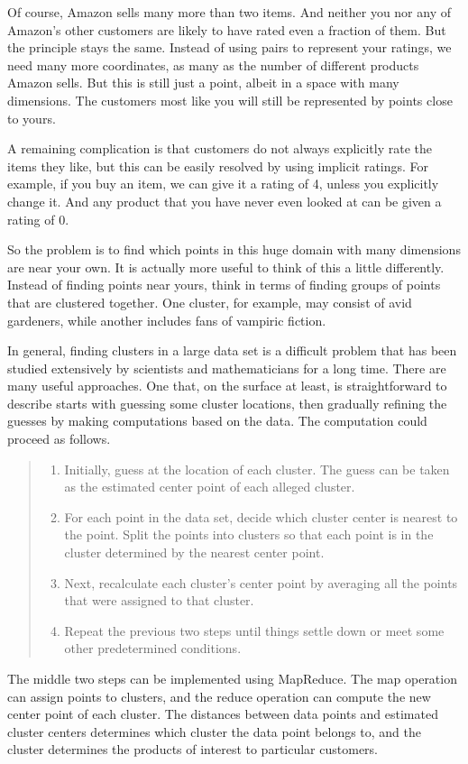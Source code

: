 Of course, Amazon sells many more than two items.  And neither you nor any
of Amazon's other customers are likely to have rated even a fraction of them.
But the principle stays the same.  Instead of using pairs to represent your
ratings, we need many more coordinates, as many as the number of
different products Amazon sells.
But this is still just a point, albeit in a space with many dimensions.
The customers most like you will still be represented by points close to yours.

A remaining complication is that customers do not always explicitly rate the
items they like, but this can be easily resolved by using implicit ratings.
For example, if you buy an item, we can give it a rating of 4, unless you
explicitly change it.  And any product that you have never even looked at
can be given a rating of 0.

So the problem is to find which points in this huge domain with many dimensions
are near your own.  It is actually more useful to think of this a little differently.
Instead of finding points near yours, think in terms of finding groups of
points that are clustered together.  One cluster, for example, may consist of
avid gardeners, while another includes fans of vampiric fiction.

In general, finding clusters in a large data set is a difficult problem
that has been studied extensively by scientists and mathematicians for a long time.
There are many useful approaches.  One that, on the surface at least,
is straightforward to describe starts with guessing some cluster locations,
then gradually refining the guesses by making computations based on the data.
The computation could proceed as follows.
\begin{quote}
\label{cluster-process}
\begin{enumerate}
    \item Initially, guess at the location of each cluster.  The guess can be
        taken as the estimated center point of each alleged cluster.
    \item For each point in the data set, decide which cluster center is nearest
        to the point.  Split the points into clusters so that each point is
        in the cluster determined by the nearest center point.
    \item Next, recalculate each cluster's center point by averaging all the
        points that were assigned to that cluster.
    \item Repeat the previous two steps until things settle down or meet
        some other predetermined conditions.
\end{enumerate}
\end{quote}
The middle two steps can be implemented using MapReduce.  The map operation can
assign points to clusters, and the reduce operation can compute the new center
point of each cluster.  The distances between data points 
and estimated cluster centers determines which cluster the data point belongs to,
and the cluster determines the products of interest to particular customers.

